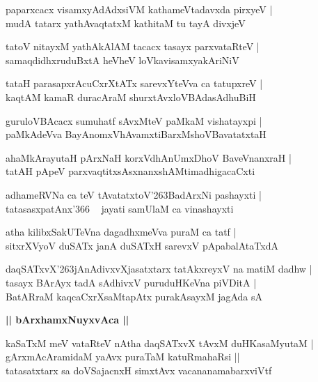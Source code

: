 \documentclass[twoside,12pt,openright]{book}
\def\S{\char'263}
\newcounter{shloka}[chapter]
\def\uvaca#1{\centerline{{\large\textbf{#1}}}}
\begin{document}
\begin{shloka}%
paparxcacx visamxyAdAdxsiVM kathameVtadavxda pirxyeV |\\
mudA tatarx yathAvaqtatxM kathitaM tu tayA divxjeV 
\end{shloka}

\begin{shloka}%
tatoV nitayxM yathAkAlAM tacacx tasayx parxvataRteV |\\
samaqdidhxruduBxtA heVheV loVkavisamxyakAriNiV 
\end{shloka}

\begin{shloka}%
tataH parasapxrAcuCxrXtATx sarevxYteVva ca tatupxreV |\\
kaqtAM kamaR duracAraM shurxtAvxloVBAdasAdhuBiH 
\end{shloka}

\begin{shloka}%
guruloVBAcacx sumuhatf sAvxMteV paMkaM vishatayxpi |\\
paMkAdeVva BayAnomxVhAvamxtiBarxMshoVBavatatxtaH 
\end{shloka}

\begin{shloka}%
ahaMkArayutaH pArxNaH korxVdhAnUmxDhoV BaveVnanxraH |\\
tatAH pApeV parxvaqtitxsAsxnanxshAMtimadhigacaCxti 	
\end{shloka}

\begin{shloka}%
adhameRVNa ca teV tAvatatxtoV\S BadArxNi pashayxti |\\
tatasasxpatAnx\char'366 ~ jayati samUlaM ca vinashayxti 
\end{shloka}

\begin{shloka}%
atha kilibxSakUTeVna dagadhxmeVva puraM ca tatf |\\
sitxrXVyoV duSATx janA duSATxH sarevxV pApabalAtaTxdA 	
\end{shloka}

\begin{shloka}%
daqSATxvX\S jAnAdivxvXjasatxtarx tatAkxreyxV na matiM dadhw |\\
tasayx BArAyx tadA sAdhivxV puruduHKeVna piVDitA |\\
BatARraM kaqcaCxrXsaMtapAtx purakAsayxM jagAda sA 
\end{shloka}

\uvaca{|| bArxhamxNuyxvAca ||}

\begin{shloka}%
kaSaTxM meV vataRteV nAtha daqSATxvX tAvxM duHKasaMyutaM |\\
gArxmAcAramidaM yaAvx puraTaM katuRmahaRsi ||\\
tatasatxtarx sa doVSajacnxH simxtAvx vacananamabarxviVtf
\end{shloka}
\end{document}
